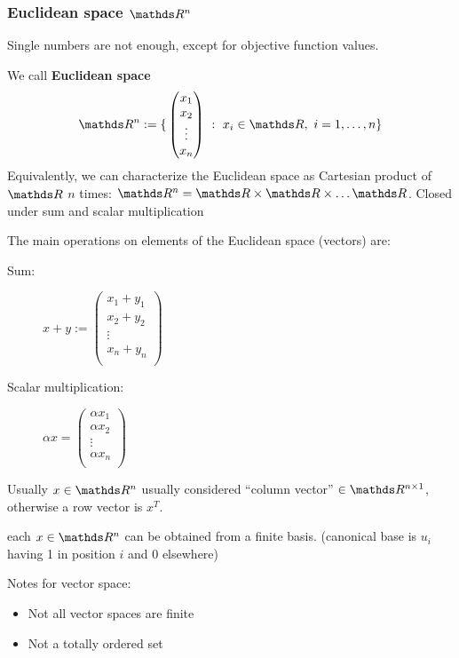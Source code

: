 \documentclass[computational_mathematics.tex]{subfiles}
\begin{document}
\subsubsection{Euclidean space $\R^n$}
Single numbers are not enough, except for objective function values.
\begin{definition}
We call \textbf{Euclidean space}
\[
  \R^n := \{ \, \begin{pmatrix}x_1\\ x_2\\ \vdots\\ x_n\end{pmatrix}~:~x_i \in \R,~i = 1, \ldots, n\}
\]
Equivalently, we can characterize the Euclidean space as Cartesian product of $\R$ $n$ times: $\R^n = \R \times \R \times \ldots \R$. Closed under sum and scalar multiplication
\end{definition}

The main operations on elements of the Euclidean space (vectors) are:

\begin{description}
  \item[{\sc Sum:}] $x + y := \begin{pmatrix}x_1 + y_1\\
      x_2 + y_2\\
      \vdots\\
      x_n + y_n\\
  \end{pmatrix}$
\item[{\sc Scalar multiplication:}] $\alpha x = \begin{pmatrix}\alpha x_1\\
    \alpha x_2\\
    \vdots\\
    \alpha x_n\\
  \end{pmatrix}$
\end{description}

Usually $x \in \R^n$ usually considered “column vector” $\in \R^{n \times 1}$, otherwise a row vector is  $x^T$.

\begin{definition} each $x \in \R^n$ can be obtained from a finite basis. (canonical base is $u_i$ having 1 in position $i$ and 0 elsewhere)
\end{definition}
Notes for vector space:
\begin{itemize}
    \item Not all vector spaces are finite
    \item Not a totally ordered set
\end{itemize}
\end{document}
